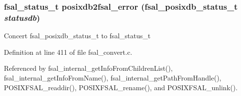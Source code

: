 \subsubsection[{posixdb2fsal\_\-error}]{\setlength{\rightskip}{0pt plus 5cm}fsal\_\-status\_\-t posixdb2fsal\_\-error (fsal\_\-posixdb\_\-status\_\-t {\em statusdb})}\label{fsal__convert_8c_a9ea1023587982b3087afb63e2afe32b4}
Concert fsal\_\-posixdb\_\-status\_\-t to fsal\_\-status\_\-t 

Definition at line 411 of file fsal\_\-convert.c.

Referenced by fsal\_\-internal\_\-getInfoFromChildrenList(), fsal\_\-internal\_\-getInfoFromName(), fsal\_\-internal\_\-getPathFromHandle(), POSIXFSAL\_\-readdir(), POSIXFSAL\_\-rename(), and POSIXFSAL\_\-unlink().